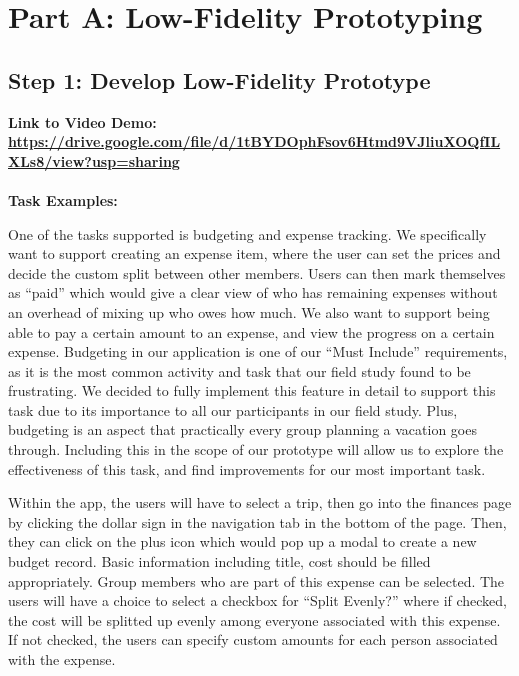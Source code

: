 \documentclass[12pt,a4paper]{article}
\begin{document}

\newpage
{}   
\tableofcontents
\newpage
{} 



\section{Part A: Low-Fidelity Prototyping}
\subsection{Step 1: Develop Low-Fidelity Prototype}

\noindent \textbf{Link to Video Demo:}\\
\textbf{\underline{https://drive.google.com/file/d/1tBYDOphFsov6Htmd9VJliuXOQfILXLs8/view?usp=sharing}}
\\\\
\textbf{Task Examples:} 
\par
\indent
One of the tasks supported is budgeting and expense tracking. We specifically want to support creating an expense item, where the user can set the prices and decide the custom split between other members. Users can then mark themselves as “paid” which would give a clear view of who has remaining expenses without an overhead of mixing up who owes how much. We also want to support being able to pay a certain amount to an expense, and view the progress on a certain expense. Budgeting in our application is one of our “Must Include” requirements, as it is the most common activity and task that our field study found to be frustrating. We decided to fully implement this feature in detail to support this task due to its importance to all our participants in our field study. Plus, budgeting is an aspect that practically every group planning a vacation goes through. Including this in the scope of our prototype will allow us to explore the effectiveness of this task, and find improvements for our most important task. 
\newline

\par
\indent
Within the app, the users will have to select a trip, then go into the finances page by clicking the dollar sign in the navigation tab in the bottom of the page. Then, they can click on the plus icon which would pop up a modal to create a new budget record. Basic information including title, cost should be filled appropriately. Group members who are part of this expense can be selected. The users will have a choice to select a checkbox for “Split Evenly?” where if checked, the cost will be splitted up evenly among everyone associated with this expense. If not checked, the users can specify custom amounts for each person associated with the expense.
\\
\end{document}
